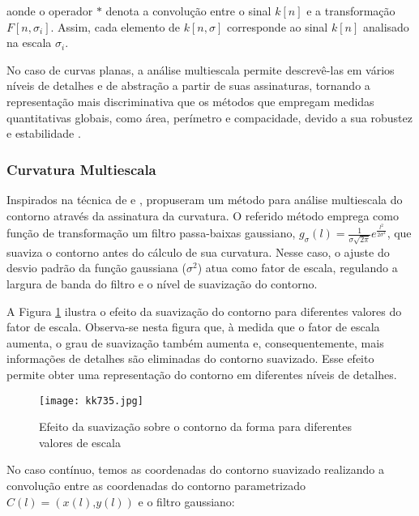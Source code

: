 \noindent
 aonde o operador $*$ denota a convolução entre o sinal $k[n]$ e a transformação $F[n,\sigma_i]$.  Assim, cada elemento de $k[n,\sigma]$ corresponde ao sinal $k[n]$ analisado na escala $\sigma_i$.

No caso de curvas planas, a análise multiescala permite descrevê-las em vários níveis de detalhes e de abstração a partir de suas assinaturas, tornando a representação mais discriminativa que os métodos que empregam medidas quantitativas globais, como área, perímetro e compacidade, devido a sua robustez e estabilidade \cite{4756134}.    

\subsubsection*{Curvatura Multiescala\label{subsec:curvMS}}

Inspirados na técnica de  e ,  propuseram um método para análise multiescala do contorno através da assinatura da curvatura. O referido método emprega como função de transformação um filtro passa-baixas gaussiano, $g_{\sigma}(l) = \frac{1}{\sigma\sqrt{2\pi}}e^{\frac{l^2}{2\sigma^2}}$, que suaviza o contorno antes do cálculo de sua curvatura. Nesse caso, o ajuste do desvio padrão da função gaussiana ($\sigma^2$) atua como fator de escala, regulando a largura de banda do filtro e o nível de suavização do contorno.

A Figura \ref{fig:kk_cont} ilustra o efeito da suavização do contorno para diferentes valores do fator de escala. Observa-se nesta figura que, à medida que o fator de escala aumenta, o grau de suavização também aumenta e, consequentemente, mais informações de detalhes são eliminadas do contorno suavizado. Esse efeito permite obter uma representação do contorno em diferentes níveis de detalhes.

\begin{figure}[h!]
  \caption{\label{fig:kk_cont} Efeito da suavização sobre o contorno da forma para diferentes valores de escala }
  \centering
  \texttt{[image: kk735.jpg]}
 \end{figure}



No caso contínuo, temos as coordenadas do contorno suavizado realizando a convolução entre as coordenadas do contorno parametrizado $C(l) = (x(l)\text{,}y(l))$ e o filtro gaussiano:  

